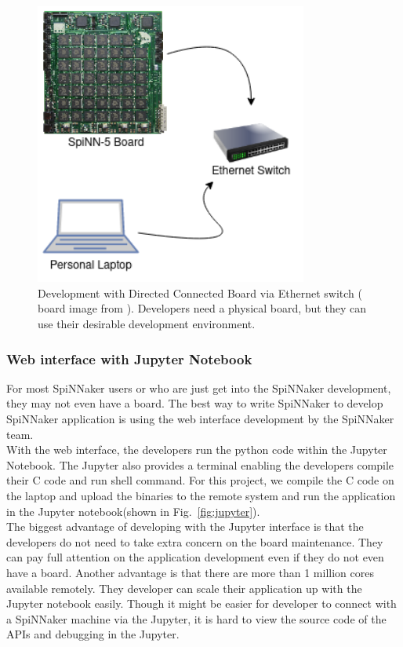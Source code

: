 \begin{figure}
\centering
   \centering
       \includegraphics[width=0.8\textwidth]{figures/laptop.png}
       \caption{Development with Directed Connected Board via Ethernet switch ( board image from \cite{spinn-core}). Developers need a physical board, but they can use their desirable development environment.}
       \label{fig:laptop}
\end{figure}


\subsubsection{Web interface with Jupyter Notebook}
For most SpiNNaker users or who are just get into the SpiNNaker development, they may not even have a board. The best way to write SpiNNaker to develop SpiNNaker application is using the web interface development by the SpiNNaker team. \\

With the web interface, the developers run the python code within the Jupyter Notebook. The Jupyter also provides a terminal enabling the developers compile their C code and run shell command. For this project, we compile the C code on the laptop and upload the binaries to the remote system and run the application in the Jupyter notebook(shown in Fig.~\ref{fig:jupyter}).\\

The biggest advantage of developing with the Jupyter interface is that the developers do not need to take extra concern on the board maintenance. They can pay full attention on the application development even if they do not even have a board. Another advantage is that there are more than 1 million cores available remotely. They developer can scale their application up with the Jupyter notebook easily. Though it might be easier for developer to connect with a SpiNNaker machine via the Jupyter, it is hard to view the source code of the APIs and debugging in the Jupyter. \\

